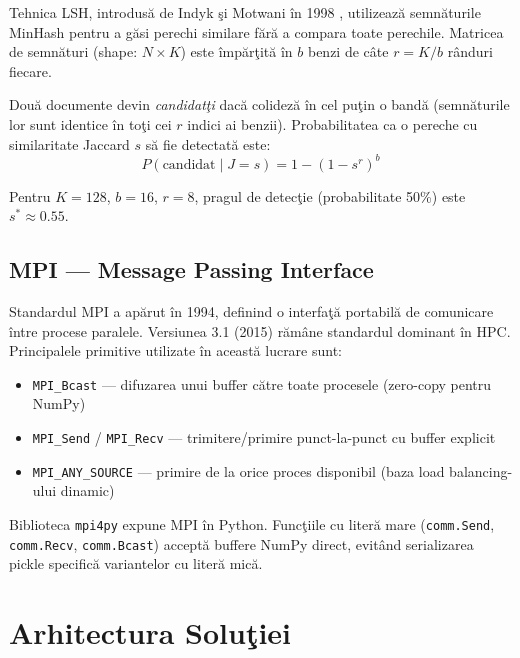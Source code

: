 \documentclass[a4paper,12pt]{report}
\begin{document}
Tehnica \ac{LSH}, introdus\u{a} de Indyk \c{s}i Motwani \^{i}n 1998 \cite{indyk1998}, utilizeaz\u{a} semn\u{a}turile MinHash pentru a g\u{a}si perechi similare f\u{a}r\u{a} a compara toate perechile. Matricea de semn\u{a}turi (shape: $N \times K$) este \^{i}mp\u{a}r\c{t}it\u{a} \^{i}n $b$ benzi de c\^{a}te $r = K/b$ r\^{a}nduri fiecare.

Dou\u{a} documente devin \textit{candidat\c{t}i} dac\u{a} colidez\u{a} \^{i}n cel pu\c{t}in o band\u{a} (semn\u{a}turile lor sunt identice \^{i}n to\c{t}i cei $r$ indici ai benzii). Probabilitatea ca o pereche cu similaritate Jaccard $s$ s\u{a} fie detectat\u{a} este:
\begin{equation}
  P(\text{candidat} \mid J = s) = 1 - (1 - s^r)^b
\label{eq:lsh_prob}
\end{equation}

Pentru $K=128$, $b=16$, $r=8$, pragul de detec\c{t}ie (probabilitate 50\%) este $s^* \approx 0.55$.

\section{MPI — Message Passing Interface}

Standardul \ac{MPI} a ap\u{a}rut \^{i}n 1994, definind o interfa\c{t}\u{a} portabil\u{a} de comunicare \^{i}ntre procese paralele. Versiunea 3.1 (2015) r\u{a}m\^{a}ne standardul dominant \^{i}n \ac{HPC}. Principalele primitive utilizate \^{i}n aceast\u{a} lucrare sunt:
\begin{itemize}
  \item \texttt{MPI\_Bcast} — difuzarea unui buffer c\u{a}tre toate procesele (zero-copy pentru NumPy)
  \item \texttt{MPI\_Send} / \texttt{MPI\_Recv} — trimitere/primire punct-la-punct cu buffer explicit
  \item \texttt{MPI\_ANY\_SOURCE} — primire de la orice proces disponibil (baza load balancing-ului dinamic)
\end{itemize}

Biblioteca \texttt{mpi4py} \cite{dalcin2011} expune \ac{MPI} \^{i}n Python. Func\c{t}iile cu liter\u{a} mare (\texttt{comm.Send}, \texttt{comm.Recv}, \texttt{comm.Bcast}) accept\u{a} buffere NumPy direct, evit\^{a}nd serializarea pickle specific\u{a} variantelor cu liter\u{a} mic\u{a}.

\chapter{Arhitectura Solu\c{t}iei}
\end{document}
